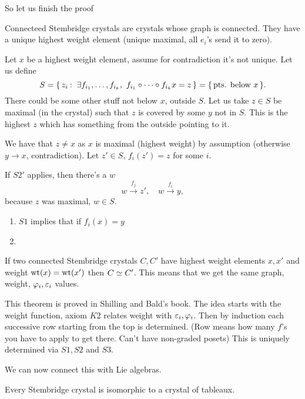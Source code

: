 \documentclass[12pt]{memoir}
\begin{document}
So let us finish the proof 

\begin{Th}
    Connecteed Stembridge crystals are crystals whose graph is connected. They have a unique highest weight element (unique maximal, all $e_i$'s send it to zero).
\end{Th}

\begin{ptcbp}
    Let $x$ be a highest weight element, assume for contradiction it's not unique. Let us define 
    $$S=\{\,z_i\mathbin{:}\ \exists f_{i_1},\dots,f_{i_k},\ f_{i_1}\circ\dots\circ f_{i_k}x=z\,\}=\{\,\text{pts. below }x\,\}.$$
    There could be some other stuff not below $x$, outside $S$. Let us take $z\in S$ be maximal (in the crystal) such that $z$ is covered by some $y$ not in $S$. This is the highest $z$ which has something from the outside pointing to it.\par
    We have that $z\neq x$ as $x$ is maximal (highest weight) by assumption (otherwise $y\to x$, contradiction). Let $z'\in S$, $f_i(z')=z$ for some $i$.\par
    If $S2'$ applies, then there's a $w$ 
    $$w\xrightarrow{f_j}z',\quad w\xrightarrow{f_i}y,$$
    because $z$ was maximal, $w\in S$.\par
    \begin{enumerate}
        \item $S1$ implies that if $f_i(x)=y$
        \item {}
    \end{enumerate}
\end{ptcbp}

\begin{Th}
    If two connected Stembridge crystals $C,C'$ have highest weight elements $x,x'$ and weight $\mathrm{wt}(x)=\mathrm{wt}(x')$ then $C\simeq C'$. This means that we get the same graph, weight, $\varphi_i,\varepsilon_i$ values.
\end{Th}

This theorem is proved in Shilling and Bald's book. The idea starts with the weight function, axiom $K2$ relates weight with $\varepsilon_i,\varphi_i$. Then by induction each successive row starting from the top is determined. (Row means how many $f$'s you have to apply to get there. Can't have non-graded posets) This is uniquely determined via $S1,S2$ and $S3$.\par
We can now connect this with Lie algebras.

\begin{Cor}
    Every Stembridge crystal is isomorphic to a crystal of tableaux.
\end{Cor}
\end{document}
